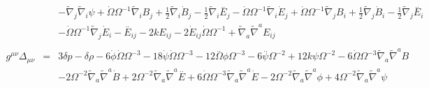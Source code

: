 \documentclass[10pt,letterpaper]{article}
\numberwithin{equation}{section}
\begin{document}
\begin{eqnarray}
&& -  \tilde{\nabla}_{j}\tilde{\nabla}_{i}\psi +\dot{\Omega} \Omega^{-1} \tilde{\nabla}_{i}B_{j} + \tfrac{1}{2} \tilde{\nabla}_{i}\dot{B}_{j} -  \tfrac{1}{2} \tilde{\nabla}_{i}\overset{..}{E}_{j} -  \dot{\Omega} \Omega^{-1} \tilde{\nabla}_{i}\dot{E}_{j} + \dot{\Omega} \Omega^{-1} \tilde{\nabla}_{j}B_{i} + \tfrac{1}{2} \tilde{\nabla}_{j}\dot{B}_{i} -  \tfrac{1}{2} \tilde{\nabla}_{j}\overset{..}{E}_{i} \nonumber \\ 
&& -  \dot{\Omega} \Omega^{-1} \tilde{\nabla}_{j}\dot{E}_{i}- \overset{..}{E}_{ij} - 2 k E_{ij} - 2 \dot{E}_{ij} \dot{\Omega} \Omega^{-1} + \tilde{\nabla}_{a}\tilde{\nabla}^{a}E_{ij}
\\  \nonumber\\ 
g^{\mu\nu}\Delta_{\mu\nu}&=& 3 \delta p -  \delta \rho - 6 \dot{\phi} \dot{\Omega} \Omega^{-3} - 18 \dot{\psi} \dot{\Omega} \Omega^{-3} - 12 \overset{..}{\Omega} \phi \Omega^{-3} - 6 \overset{..}{\psi} \Omega^{-2} + 12 k \psi \Omega^{-2} - 6 \dot{\Omega} \Omega^{-3} \tilde{\nabla}_{a}\tilde{\nabla}^{a}B \nonumber \\ 
&& - 2 \Omega^{-2} \tilde{\nabla}_{a}\tilde{\nabla}^{a}\dot{B} + 2 \Omega^{-2} \tilde{\nabla}_{a}\tilde{\nabla}^{a}\overset{..}{E} + 6 \dot{\Omega} \Omega^{-3} \tilde{\nabla}_{a}\tilde{\nabla}^{a}\dot{E} - 2 \Omega^{-2} \tilde{\nabla}_{a}\tilde{\nabla}^{a}\phi + 4 \Omega^{-2} \tilde{\nabla}_{a}\tilde{\nabla}^{a}\psi 
\end{eqnarray}
%
\end{document}
